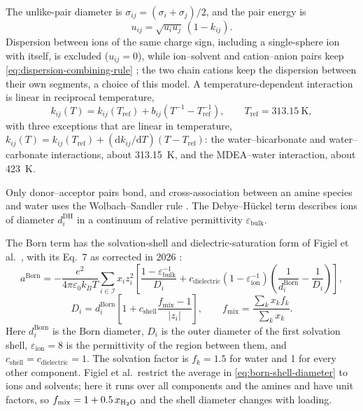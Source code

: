 The unlike-pair diameter is $\sigma_{ij}=(\sigma_i+\sigma_j)/2$, and the pair energy is
\begin{equation}
    u_{ij}=\sqrt{u_iu_j}\,\left(1-k_{ij}\right).
    \label{eq:dispersion-combining-rule}
\end{equation}
Dispersion between ions of the same charge sign, including a single-sphere ion with itself, is excluded ($u_{ij}=0$), while ion--solvent and cation--anion pairs keep \cref{eq:dispersion-combining-rule} \cite{Figiel2025}; the two chain cations keep the dispersion between their own segments, a choice of this model.
A temperature-dependent interaction is linear in reciprocal temperature,
\begin{equation}
 k_{ij}(T)=k_{ij}(T_{\mathrm{ref}})+b_{ij}(T^{-1}-T_{\mathrm{ref}}^{-1}),
 \qquad T_{\mathrm{ref}}=\SI{313.15}{\kelvin},
 \label{eq:kij-temperature}
\end{equation}
with three exceptions that are linear in temperature, $k_{ij}(T)=k_{ij}(T_{\mathrm{ref}})+(\mathrm{d}k_{ij}/\mathrm{d}T)(T-T_{\mathrm{ref}})$: the water--bicarbonate and water--carbonate interactions, about \SI{313.15}{\kelvin}, and the MDEA--water interaction, about \SI{423}{\kelvin}.

Only donor--acceptor pairs bond, and cross-association between an amine species and water uses the Wolbach--Sandler rule \cite{Kleiner2007}.
The Debye--H\"uckel term describes ions of diameter $d_i^{\mathrm{DH}}$ in a continuum of relative permittivity $\varepsilon_{\mathrm{bulk}}$.

The Born term has the solvation-shell and dielectric-saturation form of Figiel et al.\ \cite{Figiel2025}, with its Eq.~7 as corrected in 2026 \cite{Figiel2026Correction}:
\begin{equation}
    a^{\mathrm{Born}}
    =
    -\frac{e^2}{4\pi\varepsilon_0k_BT}
    \sum_{i\in\mathcal{I}}x_iz_i^2
    \left[
        \frac{1-\varepsilon_{\mathrm{bulk}}^{-1}}{D_i}
        +c_{\mathrm{dielectric}}\left(1-\varepsilon_{\mathrm{ion}}^{-1}\right)
        \left(\frac{1}{d_i^{\mathrm{Born}}}-\frac{1}{D_i}\right)
    \right],
    \label{eq:born-ssm-ds}
\end{equation}
\begin{equation}
    D_i=d_i^{\mathrm{Born}}\left[1+c_{\mathrm{shell}}\frac{f_{\mathrm{mix}}-1}{|z_i|}\right],
    \qquad
    f_{\mathrm{mix}}=\frac{\sum_kx_kf_k}{\sum_kx_k}.
    \label{eq:born-shell-diameter}
\end{equation}
Here \(d_i^{\mathrm{Born}}\) is the Born diameter, \(D_i\) is the outer diameter of the first solvation shell, \(\varepsilon_{\mathrm{ion}}=8\) is the permittivity of the region between them, and \(c_{\mathrm{shell}}=c_{\mathrm{dielectric}}=1\).
The solvation factor is \(f_k=1.5\) for water \cite{Figiel2025} and 1 for every other component.
Figiel et al.\ restrict the average in \cref{eq:born-shell-diameter} to ions and solvents; here it runs over all components and the amines and \COtwo have unit factors, so \(f_{\mathrm{mix}}=1+0.5\,x_{\HtwoO}\) and the shell diameter changes with loading.

